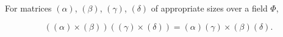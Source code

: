 For matrices $(\alpha)$, $(\beta)$, $(\gamma)$, $(\delta)$ of appropriate sizes over a field $\Phi$,

$$((\alpha) \times (\beta))((\gamma) \times (\delta)) = (\alpha)(\gamma) \times (\beta)(\delta).$$
